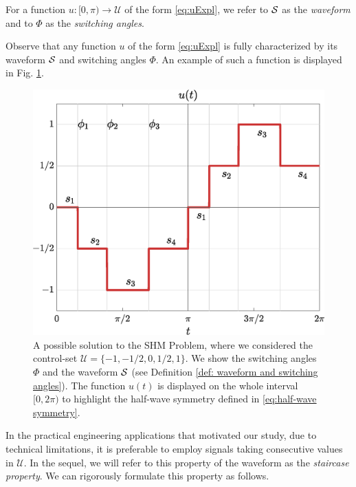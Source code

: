 \documentclass[twocolumn]{autart}    %
\begin{document}
\vspace{0.5em}
\begin{definition}\label{def: waveform and switching angles}
For a function $u: [0,\pi) \to \mathcal{U}$ of the form \eqref{eq:uExpl}, we refer to $\mathcal{S}$ as the \emph{waveform} and to $\Phi$ as the \emph{switching angles}.
\end{definition}

Observe that any function $u$ of the form \eqref{eq:uExpl} is fully characterized by its waveform $\mathcal{S}$ and switching angles $\Phi$. An example of such a function is displayed in Fig. \ref{fig:exampleSHE}. 

\begin{figure}[h]
	\centering
	\includegraphics[scale=0.3]{img/fig01.eps} 
	\caption{A possible solution to the SHM Problem, where we considered the control-set $\mathcal{U} = \{-1, -1/2, 0, 1/2, 1\}$. We show the switching angles $\Phi$ and the waveform $\mathcal{S}$ (see Definition \ref{def: waveform and switching angles}). The function $u(t)$ is displayed on the whole interval $[0,2\pi)$ to highlight the half-wave symmetry defined in \eqref{eq:half-wave symmetry}.}
	\label{fig:exampleSHE}
\end{figure}

In the practical engineering applications that motivated our study, due to technical limitations, it is preferable to employ signals taking consecutive values in $\mathcal{U}$. In the sequel, we will refer to this property of the waveform as the \emph{staircase property}. We can rigorously formulate this property as follows.
\end{document}
